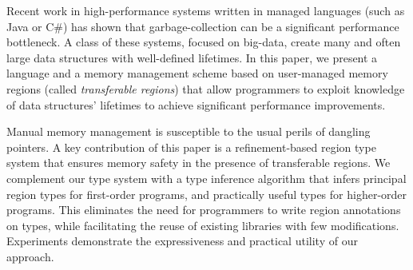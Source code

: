 Recent work in high-performance systems written in managed languages
(such as Java or C\#) has shown that garbage-collection can be a
significant performance bottleneck.  A class of these systems, focused
on big-data, create many and often large data structures with
well-defined lifetimes.  In this paper, we present a language and a
memory management scheme based on user-managed memory regions (called
\emph{transferable regions}) that allow programmers to exploit
knowledge of data structures' lifetimes to achieve significant
performance improvements.

Manual memory management is susceptible to the usual perils of
dangling pointers. A key contribution of this paper is a
refinement-based region type system that ensures memory safety
in the presence of transferable regions. We complement
our type system with a type inference algorithm that infers principal
region types for first-order programs, and practically useful types
for higher-order programs. This eliminates the need for programmers to
write region annotations on types, while facilitating the reuse of
existing libraries with few modifications. Experiments demonstrate
the expressiveness and practical utility of our approach.

